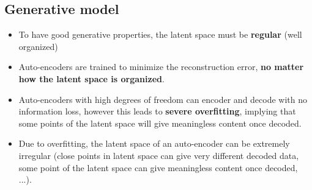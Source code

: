 \subsection{Generative model}
\begin{itemize}
    \item To have good generative properties, the latent space must be \textbf{regular} (well organized)
    \item Auto-encoders are trained to minimize the reconstruction error, \textbf{no matter how the latent space is organized}.
    \item Auto-encoders with high degrees of freedom can encoder and decode with no information loss, however this leads to \textbf{severe overfitting}, implying that some points of the latent space will give meaningless content once decoded.
    \item Due to overfitting, the latent space of an auto-encoder can be extremely irregular (close points in latent space can give very different decoded data, some point of the latent space can give meaningless content once decoded, ...).
\end{itemize}

